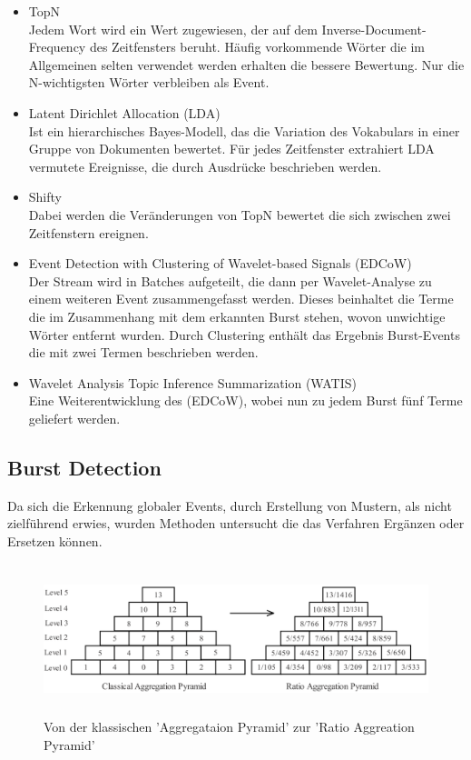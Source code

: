 \begin{itemize}
\item TopN\\Jedem Wort wird ein Wert zugewiesen, der auf dem Inverse-Document-Frequency des Zeitfensters beruht. Häufig vorkommende Wörter die im Allgemeinen selten verwendet werden erhalten die bessere Bewertung. Nur die N-wichtigsten Wörter verbleiben als Event.
\item Latent Dirichlet Allocation (LDA)\\Ist ein hierarchisches Bayes-Modell, das die Variation des Vokabulars in einer Gruppe von Dokumenten bewertet. Für jedes Zeitfenster extrahiert LDA  vermutete Ereignisse, die durch Ausdrücke beschrieben werden. 
\item Shifty\\Dabei werden die Veränderungen von TopN bewertet die sich zwischen zwei Zeitfenstern ereignen.
\item Event Detection with Clustering of
Wavelet-based Signals (EDCoW)\\Der Stream wird in Batches aufgeteilt, die dann per Wavelet-Analyse zu einem weiteren Event zusammengefasst werden. Dieses beinhaltet die Terme die im Zusammenhang mit dem erkannten Burst stehen, wovon unwichtige Wörter entfernt wurden. Durch Clustering enthält das Ergebnis Burst-Events die mit zwei Termen beschrieben werden.
\item Wavelet Analysis Topic Inference Summarization
(WATIS)\\ Eine Weiterentwicklung des (EDCoW), wobei nun zu jedem Burst fünf Terme geliefert werden.
\end{itemize}

\subsection{Burst Detection}
Da sich die Erkennung globaler Events, durch Erstellung von Mustern, als nicht zielführend erwies, wurden Methoden untersucht die das Verfahren  Ergänzen oder Ersetzen können.\\

\begin{figure}[ht]
    \centerline{\includegraphics[height=4.4cm]{images/ratiopyramid.png}}
    \caption{Von der klassischen 'Aggregataion Pyramid' zur 'Ratio Aggreation Pyramid' \cite{yuan2007online}}
    \label{fig:ratiopyramid}
\end{figure}



